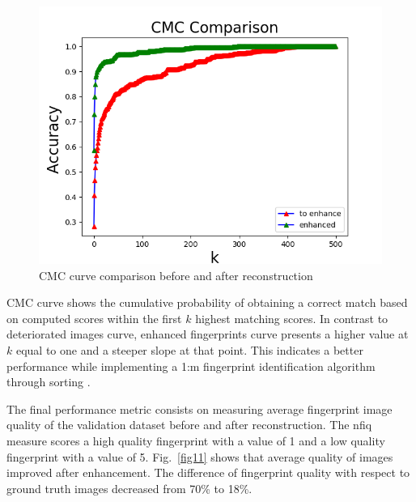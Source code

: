 \documentclass[a4paper,fleqn]{cas-dc}
\begin{document}
\begin{figure}[htbp]
\centerline{\includegraphics[scale=0.45]{figs/cmc_comparison.png}}
\caption{CMC curve comparison before and after reconstruction}
\label{fig10}
\end{figure}

CMC curve shows the cumulative probability of obtaining a correct match based on computed scores within the first $k$ highest matching scores. In contrast to deteriorated images curve, enhanced fingerprints curve presents a higher value at $k$ equal to one and a steeper slope at that point. This indicates a better performance while implementing a 1:m fingerprint identification algorithm through sorting \cite{RROCCMC}.

The final performance metric consists on measuring average fingerprint image quality of the validation dataset before and after reconstruction. The nfiq measure scores a high quality fingerprint with a value of 1 and a low quality fingerprint with a value of 5. Fig.~\ref{fig11} shows that average quality of images improved after enhancement. The difference of fingerprint quality with respect to ground truth images decreased from 70\% to 18\%.
\end{document}
